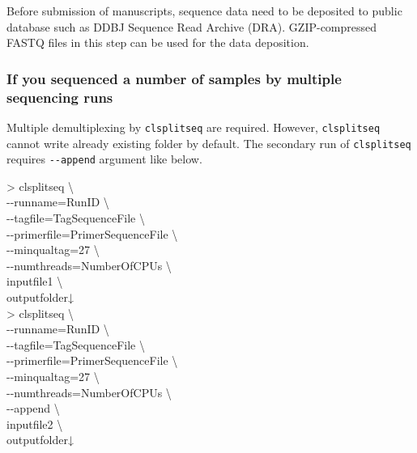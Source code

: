 \documentclass[titlepage,10pt,a4paper,english]{jsbook}
\newenvironment{cmd}{\begin{oframed}\raggedright\ttfamily\footnotesize\setlength{\baselineskip}{1.4em}}{\end{oframed}\vspace{-1em}}
\begin{document}
Before submission of manuscripts, sequence data need to be deposited to public database such as DDBJ Sequence Read Archive (DRA).
GZIP-compressed FASTQ files in this step can be used for the data deposition.

\subsubsection{If you sequenced a number of samples by multiple sequencing runs}
Multiple demultiplexing by \texttt{clsplitseq} are required.
However, \texttt{clsplitseq} cannot write already existing folder by default.
The secondary run of \texttt{clsplitseq} requires \texttt{{-}{-}append} argument like below.
\begin{cmd}
{\textgreater} clsplitseq {\textbackslash}\\
{-}{-}runname=RunID {\textbackslash}\\
{-}{-}tagfile=TagSequenceFile {\textbackslash}\\
{-}{-}primerfile=PrimerSequenceFile {\textbackslash}\\
{-}{-}minqualtag=27 {\textbackslash}\\
{-}{-}numthreads=NumberOfCPUs {\textbackslash}\\
inputfile1 {\textbackslash}\\
outputfolder↓\\
{\textgreater} clsplitseq {\textbackslash}\\
{-}{-}runname=RunID {\textbackslash}\\
{-}{-}tagfile=TagSequenceFile {\textbackslash}\\
{-}{-}primerfile=PrimerSequenceFile {\textbackslash}\\
{-}{-}minqualtag=27 {\textbackslash}\\
{-}{-}numthreads=NumberOfCPUs {\textbackslash}\\
{-}{-}append {\textbackslash}\\
inputfile2 {\textbackslash}\\
outputfolder↓
\end{cmd}
\end{document}
